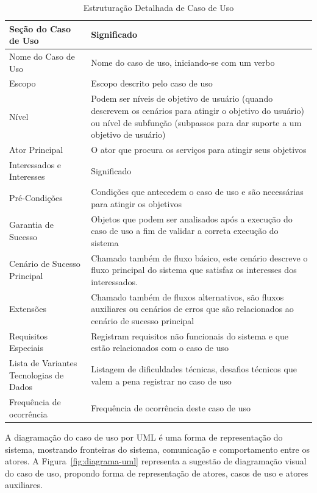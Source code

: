 \begin{table}
	\caption{Estruturação Detalhada de Caso de Uso}
	\begin{tabular}{|p{5cm} | p{9cm}|}
		\hline
		\textbf{Seção do Caso de Uso}	& \textbf{Significado} \\
		\hline
		Nome do Caso de Uso 	& Nome do caso de uso, iniciando-se com um verbo  \\
		\hline
		Escopo	& Escopo descrito pelo caso de uso \\
		\hline
		Nível	& Podem ser níveis de objetivo de usuário (quando descrevem os cenários para atingir o objetivo do usuário) ou nível de subfunção (subpassos para dar suporte a um objetivo de usuário) \\
		\hline
		Ator Principal	& O ator que procura os serviços para atingir seus objetivos  \\
		\hline
		Interessados e Interesses	& Significado  \\
		\hline
		Pré-Condições	& Condições que antecedem o caso de uso e são necessárias para atingir os objetivos \\
		\hline
		Garantia de Sucesso	& Objetos que podem ser analisados após a execução do caso de uso a fim de validar a correta execução do sistema  \\
		\hline
		Cenário de Sucesso Principal	& Chamado também de fluxo básico, este cenário descreve o fluxo principal do sistema que satisfaz os interesses dos interessados.  \\
		\hline
		Extensões	& Chamado também de fluxos alternativos, são fluxos auxiliares ou cenários de erros que são relacionados ao cenário de sucesso principal \\
		\hline
		Requisitos Especiais	& Registram requisitos não funcionais do sistema e que estão relacionados com o caso de uso \\
		\hline
		Lista de Variantes Tecnologias de Dados	& Listagem de dificuldades técnicas, desafios técnicos que valem a pena registrar no caso de uso \\
		\hline
		Frequência de ocorrência	& Frequência de ocorrência deste caso de uso \\
		\hline
	\end{tabular}
	\label{tabela:topicos_uc}
\end{table}

A diagramação do caso de uso por UML é uma forma de representação do sistema, mostrando fronteiras do sistema, comunicação e comportamento entre os atores. A Figura~\ref{fig:diagrama-uml} representa a sugestão de diagramação visual do caso de uso, propondo forma de representação de atores, casos de uso e atores auxiliares.

